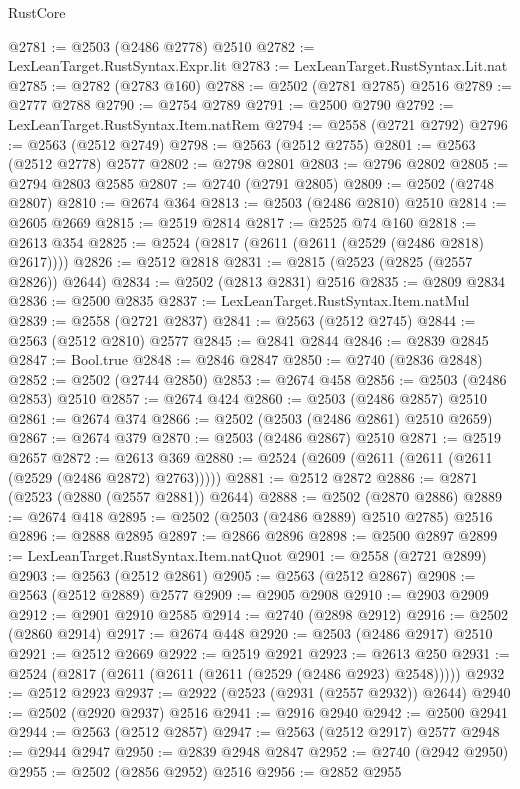 \begin{lexlean}{RustCore}
\begin{coremodule}
@2781 := @2503 (@2486 @2778) @2510
@2782 := LexLeanTarget.RustSyntax.Expr.lit
@2783 := LexLeanTarget.RustSyntax.Lit.nat
@2785 := @2782 (@2783 @160)
@2788 := @2502 (@2781 @2785) @2516
@2789 := @2777 @2788
@2790 := @2754 @2789
@2791 := @2500 @2790
@2792 := LexLeanTarget.RustSyntax.Item.natRem
@2794 := @2558 (@2721 @2792)
@2796 := @2563 (@2512 @2749)
@2798 := @2563 (@2512 @2755)
@2801 := @2563 (@2512 @2778) @2577
@2802 := @2798 @2801
@2803 := @2796 @2802
@2805 := @2794 @2803 @2585
@2807 := @2740 (@2791 @2805)
@2809 := @2502 (@2748 @2807)
@2810 := @2674 @364
@2813 := @2503 (@2486 @2810) @2510
@2814 := @2605 @2669
@2815 := @2519 @2814
@2817 := @2525 @74 @160
@2818 := @2613 @354
@2825 := @2524 (@2817 (@2611 (@2611 (@2529 (@2486 @2818) @2617))))
@2826 := @2512 @2818
@2831 := @2815 (@2523 (@2825 (@2557 @2826)) @2644)
@2834 := @2502 (@2813 @2831) @2516
@2835 := @2809 @2834
@2836 := @2500 @2835
@2837 := LexLeanTarget.RustSyntax.Item.natMul
@2839 := @2558 (@2721 @2837)
@2841 := @2563 (@2512 @2745)
@2844 := @2563 (@2512 @2810) @2577
@2845 := @2841 @2844
@2846 := @2839 @2845
@2847 := Bool.true
@2848 := @2846 @2847
@2850 := @2740 (@2836 @2848)
@2852 := @2502 (@2744 @2850)
@2853 := @2674 @458
@2856 := @2503 (@2486 @2853) @2510
@2857 := @2674 @424
@2860 := @2503 (@2486 @2857) @2510
@2861 := @2674 @374
@2866 := @2502 (@2503 (@2486 @2861) @2510 @2659)
@2867 := @2674 @379
@2870 := @2503 (@2486 @2867) @2510
@2871 := @2519 @2657
@2872 := @2613 @369
@2880 := @2524 (@2609 (@2611 (@2611 (@2611 (@2529 (@2486 @2872) @2763)))))
@2881 := @2512 @2872
@2886 := @2871 (@2523 (@2880 (@2557 @2881)) @2644)
@2888 := @2502 (@2870 @2886)
@2889 := @2674 @418
@2895 := @2502 (@2503 (@2486 @2889) @2510 @2785) @2516
@2896 := @2888 @2895
@2897 := @2866 @2896
@2898 := @2500 @2897
@2899 := LexLeanTarget.RustSyntax.Item.natQuot
@2901 := @2558 (@2721 @2899)
@2903 := @2563 (@2512 @2861)
@2905 := @2563 (@2512 @2867)
@2908 := @2563 (@2512 @2889) @2577
@2909 := @2905 @2908
@2910 := @2903 @2909
@2912 := @2901 @2910 @2585
@2914 := @2740 (@2898 @2912)
@2916 := @2502 (@2860 @2914)
@2917 := @2674 @448
@2920 := @2503 (@2486 @2917) @2510
@2921 := @2512 @2669
@2922 := @2519 @2921
@2923 := @2613 @250
@2931 := @2524 (@2817 (@2611 (@2611 (@2611 (@2529 (@2486 @2923) @2548)))))
@2932 := @2512 @2923
@2937 := @2922 (@2523 (@2931 (@2557 @2932)) @2644)
@2940 := @2502 (@2920 @2937) @2516
@2941 := @2916 @2940
@2942 := @2500 @2941
@2944 := @2563 (@2512 @2857)
@2947 := @2563 (@2512 @2917) @2577
@2948 := @2944 @2947
@2950 := @2839 @2948 @2847
@2952 := @2740 (@2942 @2950)
@2955 := @2502 (@2856 @2952) @2516
@2956 := @2852 @2955

\end{coremodule}
\end{lexlean}
